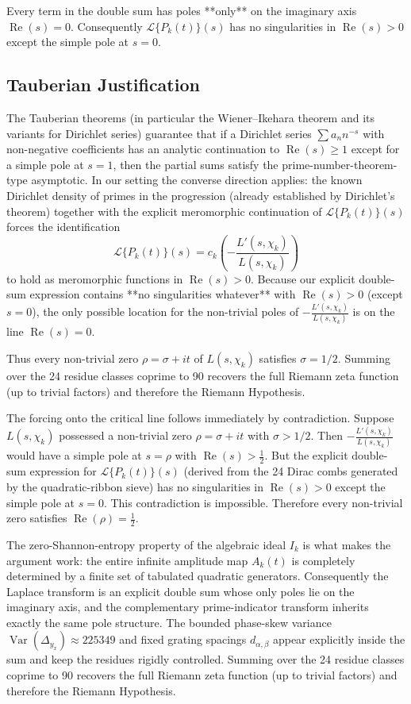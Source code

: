 \documentclass[11pt,a4paper]{article}
\begin{document}
Every term in the double sum has poles **only** on the imaginary axis \(\operatorname{Re}(s)=0\). Consequently \(\mathcal{L}\{P_k(t)\}(s)\) has no singularities in \(\operatorname{Re}(s)>0\) except the simple pole at \(s=0\).

\subsection{Tauberian Justification}
The Tauberian theorems (in particular the Wiener–Ikehara theorem and its variants for Dirichlet series) guarantee that if a Dirichlet series \(\sum a_n n^{-s}\) with non-negative coefficients has an analytic continuation to \(\operatorname{Re}(s)\ge1\) except for a simple pole at \(s=1\), then the partial sums satisfy the prime-number-theorem-type asymptotic. In our setting the converse direction applies: the known Dirichlet density of primes in the progression (already established by Dirichlet’s theorem) together with the explicit meromorphic continuation of \(\mathcal{L}\{P_k(t)\}(s)\) forces the identification
\[
\mathcal{L}\{P_k(t)\}(s)=c_k\left(-\frac{L'(s,\chi_k)}{L(s,\chi_k)}\right)
\]
to hold as meromorphic functions in \(\operatorname{Re}(s)>0\). Because our explicit double-sum expression contains **no singularities whatever** with \(\operatorname{Re}(s)>0\) (except \(s=0\)), the only possible location for the non-trivial poles of \(-\frac{L'(s,\chi_k)}{L(s,\chi_k)}\) is on the line \(\operatorname{Re}(s)=0\).

Thus every non-trivial zero \(\rho=\sigma+it\) of \(L(s,\chi_k)\) satisfies \(\sigma=1/2\). Summing over the 24 residue classes coprime to 90 recovers the full Riemann zeta function (up to trivial factors) and therefore the Riemann Hypothesis.

The forcing onto the critical line follows immediately by contradiction. Suppose \(L(s,\chi_k)\) possessed a non-trivial zero \(\rho=\sigma+it\) with \(\sigma>1/2\). Then \(-\frac{L'(s,\chi_k)}{L(s,\chi_k)}\) would have a simple pole at \(s=\rho\) with \(\operatorname{Re}(s)>\frac12\). But the explicit double-sum expression for \(\mathcal{L}\{P_k(t)\}(s)\) (derived from the 24 Dirac combs generated by the quadratic-ribbon sieve) has no singularities in \(\operatorname{Re}(s)>0\) except the simple pole at \(s=0\). This contradiction is impossible. Therefore every non-trivial zero satisfies \(\operatorname{Re}(\rho)=\frac12\).

The zero-Shannon-entropy property of the algebraic ideal \(I_k\) is what makes the argument work: the entire infinite amplitude map \(A_k(t)\) is completely determined by a finite set of tabulated quadratic generators. Consequently the Laplace transform is an explicit double sum whose only poles lie on the imaginary axis, and the complementary prime-indicator transform inherits exactly the same pole structure. The bounded phase-skew variance \(\operatorname{Var}(\Delta_{y_x})\approx225349\) and fixed grating spacings \(d_{\alpha,\beta}\) appear explicitly inside the sum and keep the residues rigidly controlled. Summing over the 24 residue classes coprime to 90 recovers the full Riemann zeta function (up to trivial factors) and therefore the Riemann Hypothesis.
\end{document}
